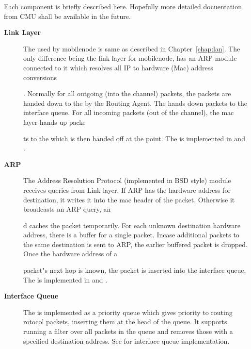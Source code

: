 Each component is briefly described here. Hopefully more detailed docuentation from CMU shall be available in the future.
\begin{description}
\item[{\bf Link Layer}] The  used by mobilenode is same as described in Chapter~\ref{chap:lan}. The only difference being the link layer for mobilenode, has an ARP module connected to it which resolves all IP to hardware (Mac) address conversions









. Normally for all outgoing (into the channel) packets, the packets are handed down to the  by the Routing Agent. The  hands down packets to the interface queue. For all incoming packets (out of the channel), the mac layer hands up packe









ts to the  which is then handed off at the  point. The  is implemented in  and .

\item [{\bf ARP}] The Address Resolution Protocol (implemented in BSD style) module receives queries from Link layer. If ARP has the hardware address for destination, it writes it into the mac header of the packet. Otherwise it broadcasts an ARP query, an









d caches the packet temporarily. For each unknown destination hardware address, there is a buffer for a single packet. Incase additional packets to the same destination is sent to ARP, the earlier buffered packet is dropped. Once the hardware address of a









 packet"s next hop is known, the packet is inserted into the interface queue. The  is implemented in  and .

\item[{\bf Interface Queue}] The  is implemented as a priority queue which gives priority to routing 
rotocol packets, inserting them at the head of the queue. It supports
running a filter over all packets in the queue and removes those with
a specified destination address. See  for 
interface queue implementation.


\end{description}

